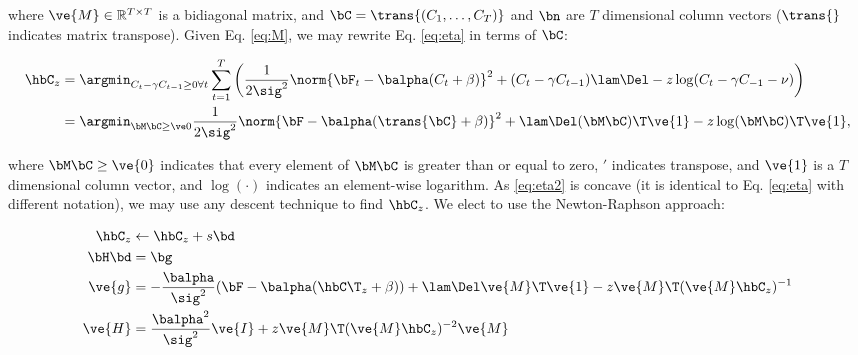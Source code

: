 \noindent where $\ve{M} \in \mathbb{R}^{T \times T}$ is a bidiagonal matrix,  and $\bC=\trans{(C_1,\ldots, C_T)}$ and $\bn$ are $T$ dimensional column vectors ($\trans{}$ indicates matrix transpose). Given Eq. \eqref{eq:M}, we may rewrite Eq. \eqref{eq:eta} in terms of $\bC$:

\begin{align} 
\hbC_{\zzz} &= \argmin_{C_t - \gamma C_{t-1} \geq 0 \forall t} \sum_{t=1}^{T} \left( \frac{1}{2 \sig^2}\norm{\bF_t -\balpha (C_t + \beta)}^2  + (C_t - \gamma C_{t-1}) \lam \Del - \zzz \log(C_t - \gamma C_{-1} -\nu ) \right) \nonumber \\
&= \az  \frac{1}{2 \sig^2} \norm{\bF - \balpha (\trans{\bC} +\beta)}^2 + \lam \Del (\bM \bC )\T \ve{1}  - \zzz \log(\bM \bC)\T\ve{1},  \label{eq:eta2}
\end{align}

\noindent where $\bM \bC \geq \ve{0}$ indicates that every element of $\bM \bC$ is greater than or equal to zero, $'$ indicates transpose, and  $\ve{1}$ is a $T$ dimensional column vector, and $\log(\cdot)$ indicates an element-wise logarithm.  As \eqref{eq:eta2} is concave (it is identical to Eq. \eqref{eq:eta} with different notation), we may use any descent technique to find $\hbC_{\zzz}$.  We elect to use the Newton-Raphson approach: 


\begin{subequations} \label{eq:NR}
\begin{align}
\hbC_{\zzz} &\leftarrow \hbC_{\zzz} + s \bd \\
\bH \bd &= \bg \\
\ve{g} &= -\frac{\balpha}{\sig^2}(\bF -\balpha({\hbC\T}_{\zzz} + \beta)) + \lam \Del \ve{M}\T \ve{1} - \zzz \ve{M}\T (\ve{M} \hbC_{\zzz})^{-1} \label{eq:g} \\
\ve{H} &= \frac{\balpha^2}{\sig^2} \ve{I} + \zzz \ve{M}\T (\ve{M} \hbC_{\zzz})^{-2} \ve{M} \label{eq:H}
\end{align}
\end{subequations}

